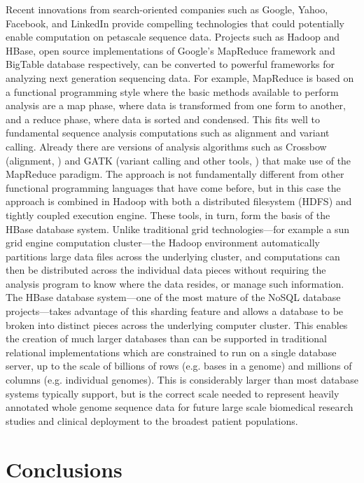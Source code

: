 \documentclass[10pt]{bmc_article}
\newenvironment{bmcformat}{\begin{raggedright}\baselineskip20pt\sloppy\setboolean{publ}{false}}{\end{raggedright}\baselineskip20pt\sloppy}
\begin{document}
\begin{bmcformat}
Recent innovations from search-oriented companies such as Google, Yahoo, Facebook, and LinkedIn provide compelling technologies that could potentially enable computation on petascale sequence data. Projects such as Hadoop and HBase, open source implementations of Google’s MapReduce framework \cite{dean2008mapreduce} and BigTable database \cite{chang2008bigtable} respectively, can be converted to powerful frameworks for analyzing next generation sequencing data. For example, MapReduce is based on a functional programming style where the basic methods available to perform analysis are a map phase, where data is transformed from one form to another, and a reduce phase, where data is sorted and condensed. This fits well to fundamental sequence analysis computations such as alignment and variant calling. Already there are versions of analysis algorithms such as Crossbow (alignment, \cite{langmead2009searching}) and GATK (variant calling and other tools, \cite{mckenna2010genome}) that make use of the MapReduce paradigm. The approach is not fundamentally different from other functional programming languages that have come before, but in this case the approach is combined in Hadoop with both a distributed filesystem (HDFS) and tightly coupled execution engine. These tools, in turn, form the basis of the HBase database system. Unlike traditional grid technologies—for example a sun grid engine computation cluster—the Hadoop environment automatically partitions large data files across the underlying cluster, and computations can then be distributed across the individual data pieces without requiring the analysis program to know where the data resides, or manage such information. The HBase database system—one of the most mature of the NoSQL database projects—takes advantage of this sharding feature and allows a database to be broken into distinct pieces across the underlying computer cluster. This enables the creation of much larger databases than can be supported in traditional relational implementations which are constrained to run on a single database server, up to the scale of billions of rows (e.g. bases in a genome) and millions of columns (e.g. individual genomes). This is considerably larger than most database systems typically support, but is the correct scale needed to represent heavily annotated whole genome sequence data for future large scale biomedical research studies and clinical deployment to the broadest patient populations.


\section*{Conclusions}


\end{bmcformat}
\end{document}
